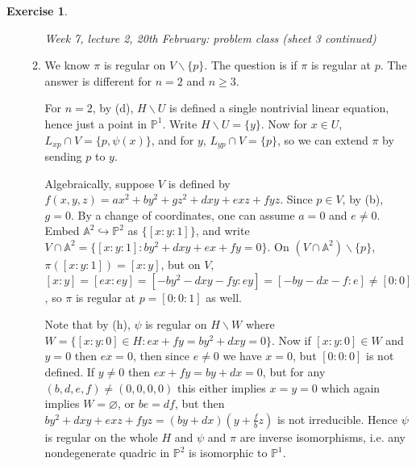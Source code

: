 \documentclass{article}
\newcommand{\A}{\mathbb{A}}
\newcommand{\p}{\mathbb{P}}
\theoremstyle{definition}
\newtheorem{exe}[defn]{Exercise}
\begin{document}
\begin{exe}
\begin{enumerate}
\begin{enumerate}
\begin{flushright}
\textit{Week 7, lecture 2, 20th February: problem class (sheet 3 continued)}
\end{flushright}

\item We know $\pi$ is regular on $V\backslash\{p\}$. The question is if $\pi$ is regular at $p$. The answer is different for $n=2$ and $n\geq 3$.

For $n=2$, by (d), $H\backslash U$ is defined a single nontrivial linear equation, hence just a point in $\p^1$. Write $H\backslash U=\{y\}$. Now for $x\in U$, $L_{xp}\cap V=\{p,\psi(x)\}$, and for $y$, $L_{yp}\cap V=\{p\}$, so we can extend $\pi$ by sending $p$ to $y$.

Algebraically, suppose $V$ is defined by $f(x,y,z)=ax^2+by^2+gz^2+dxy+exz+fyz$. Since $p\in V$, by (b), $g=0$. By a change of coordinates, one can assume $a=0$ and $e\neq 0$. Embed $\A^2\hookrightarrow\p^2$ as $\{[x:y:1]\}$, and write $V\cap\A^2=\{[x:y:1]:by^2+dxy+ex+fy=0\}$. On $(V\cap\A^2)\backslash\{p\}$, $\pi([x:y:1])=[x:y]$, but on $V$, $[x:y]=[ex:ey]=[-by^2-dxy-fy:ey]=[-by-dx-f:e]\neq [0:0]$, so $\pi$ is regular at $p=[0:0:1]$ as well.

Note that by (h), $\psi$ is regular on $H\backslash W$ where $W=\{[x:y:0]\in H:ex+fy=by^2+dxy=0\}$. Now if $[x:y:0]\in W$ and $y=0$ then $ex=0$, then since $e\neq 0$ we have $x=0$, but $[0:0:0]$ is not defined. If $y\neq 0$ then $ex+fy=by+dx=0$, but for any $(b,d,e,f)\neq (0,0,0,0)$ this either implies $x=y=0$ which again implies $W=\varnothing$, or $be=df$, but then $by^2+dxy+exz+fyz=(by+dx)\left(y+\frac{f}{b}z\right)$ is not irreducible. Hence $\psi$ is regular on the whole $H$ and $\psi$ and $\pi$ are inverse isomorphisms, i.e. any nondegenerate quadric in $\p^2$ is isomorphic to $\p^1$.


\end{enumerate}
\end{enumerate}
\end{exe}
\end{document}
